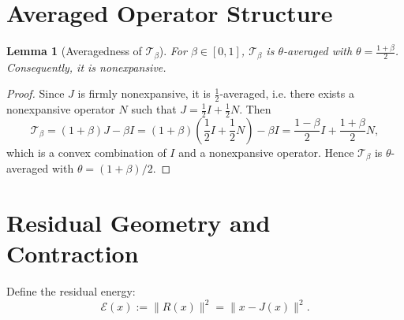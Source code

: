 \documentclass{article}
\newtheorem{lemma}{Lemma}
\begin{document}
\section{Averaged Operator Structure}

\begin{lemma}[Averagedness of $\mathcal{T}_\beta$]
For $\beta\in[0,1]$, $\mathcal{T}_\beta$ is $\theta$-averaged with $\theta = \frac{1+\beta}{2}$. Consequently, it is nonexpansive.
\end{lemma}
\begin{proof}
Since $J$ is firmly nonexpansive, it is $\frac12$-averaged, i.e. there exists a nonexpansive operator $N$ such that $J = \frac12 I + \frac12 N$. Then
\[
\mathcal{T}_\beta = (1+\beta)J - \beta I = (1+\beta)\left(\frac12 I + \frac12 N\right) - \beta I = \frac{1-\beta}{2}I + \frac{1+\beta}{2}N,
\]
which is a convex combination of $I$ and a nonexpansive operator. Hence $\mathcal{T}_\beta$ is $\theta$-averaged with $\theta = (1+\beta)/2$.
\end{proof}

\section{Residual Geometry and Contraction}

Define the residual energy:
\[
\mathcal{E}(x) := \|R(x)\|^2 = \|x - J(x)\|^2.
\]
\end{document}
